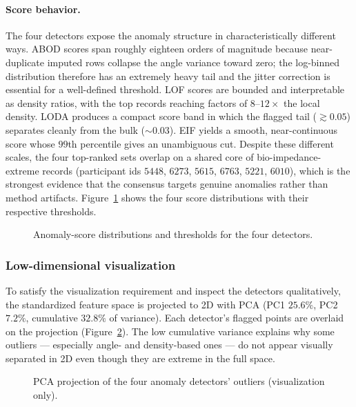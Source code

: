 \paragraph{Score behavior.} The four detectors expose the anomaly structure in characteristically different ways. ABOD scores span roughly eighteen orders of magnitude because near-duplicate imputed rows collapse the angle variance toward zero; the log-binned distribution therefore has an extremely heavy tail and the jitter correction is essential for a well-defined threshold. LOF scores are bounded and interpretable as density ratios, with the top records reaching factors of $8$--$12\times$ the local density. LODA produces a compact score band in which the flagged tail ($\gtrsim 0.05$) separates cleanly from the bulk ($\sim 0.03$). EIF yields a smooth, near-continuous score whose $99$th percentile gives an unambiguous cut. Despite these different scales, the four top-ranked sets overlap on a shared core of bio-impedance-extreme records (participant ids $5448$, $6273$, $5615$, $6763$, $5221$, $6010$), which is the strongest evidence that the consensus targets genuine anomalies rather than method artifacts. Figure~\ref{fig:cmi_outlier_scores} shows the four score distributions with their respective thresholds.

\begin{figure}[h]
    \centering
    \caption{Anomaly-score distributions and thresholds for the four detectors.}
    \label{fig:cmi_outlier_scores}
\end{figure}

\subsubsection{Low-dimensional visualization}
To satisfy the visualization requirement and inspect the detectors qualitatively, the standardized feature space is projected to 2D with PCA (PC1 $25.6\%$, PC2 $7.2\%$, cumulative $32.8\%$ of variance). Each detector's flagged points are overlaid on the projection (Figure~\ref{fig:cmi_pca_outliers}). The low cumulative variance explains why some outliers --- especially angle- and density-based ones --- do not appear visually separated in 2D even though they are extreme in the full space.

\begin{figure}[h]
    \centering
    \caption{PCA projection of the four anomaly detectors' outliers (visualization only).}
    \label{fig:cmi_pca_outliers}
\end{figure}

